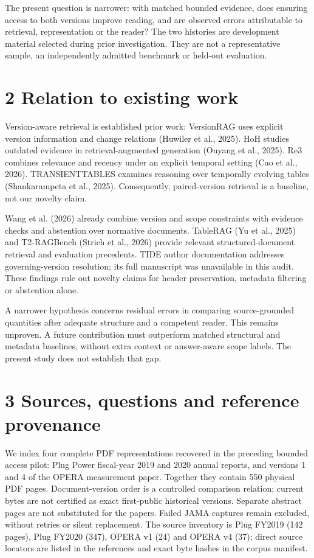 \documentclass[11pt]{article}
\begin{document}
The present question is narrower: with matched bounded evidence, does ensuring access to both versions improve reading, and are observed errors attributable to retrieval, representation or the reader? The two histories are development material selected during prior investigation. They are not a representative sample, an independently admitted benchmark or held-out evaluation.

\section*{2  Relation to existing work}
Version-aware retrieval is established prior work: VersionRAG uses explicit version information and change relations (Huwiler et al., 2025). HoH studies outdated evidence in retrieval-augmented generation (Ouyang et al., 2025). Re3 combines relevance and recency under an explicit temporal setting (Cao et al., 2026). TRANSIENTTABLES examines reasoning over temporally evolving tables (Shankarampeta et al., 2025). Consequently, paired-version retrieval is a baseline, not our novelty claim.

Wang et al. (2026) already combine version and scope constraints with evidence checks and abstention over normative documents. TableRAG (Yu et al., 2025) and T2-RAGBench (Strich et al., 2026) provide relevant structured-document retrieval and evaluation precedents. TIDE author documentation addresses governing-version resolution; its full manuscript was unavailable in this audit. These findings rule out novelty claims for header preservation, metadata filtering or abstention alone.

A narrower hypothesis concerns residual errors in comparing source-grounded quantities after adequate structure and a competent reader. This remains unproven. A future contribution must outperform matched structural and metadata baselines, without extra context or answer-aware scope labels. The present study does not establish that gap.

\section*{3  Sources, questions and reference provenance}
We index four complete PDF representations recovered in the preceding bounded access pilot: Plug Power fiscal-year 2019 and 2020 annual reports, and versions 1 and 4 of the OPERA measurement paper. Together they contain 550 physical PDF pages. Document-version order is a controlled comparison relation; current bytes are not certified as exact first-public historical versions. Separate abstract pages are not substituted for the papers. Failed JAMA captures remain excluded, without retries or silent replacement. The source inventory is Plug FY2019 (142 pages), Plug FY2020 (347), OPERA v1 (24) and OPERA v4 (37); direct source locators are listed in the references and exact byte hashes in the corpus manifest.
\end{document}
